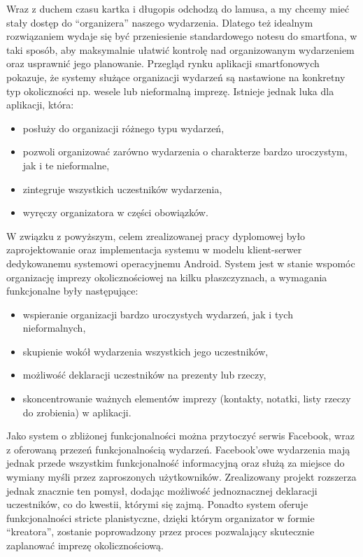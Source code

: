 \documentclass[12pt,titlepage]{article}
\begin{document}
Wraz z duchem czasu kartka i długopis odchodzą do lamusa, a my chcemy mieć stały dostęp do ``organizera'' naszego wydarzenia. Dlatego też idealnym rozwiązaniem
wydaje się być przeniesienie standardowego notesu do smartfona, w taki sposób, aby maksymalnie ułatwić kontrolę nad organizowanym wydarzeniem oraz usprawnić jego planowanie.
Przegląd rynku aplikacji smartfonowych pokazuje, że systemy służące organizacji wydarzeń są nastawione na konkretny typ okoliczności np. wesele lub nieformalną imprezę.
Istnieje jednak luka dla aplikacji, która:

\begin{itemize}
 \item posłuży do organizacji różnego typu wydarzeń,
 \item pozwoli organizować zarówno wydarzenia o charakterze bardzo uroczystym, jak i te nieformalne,
 \item zintegruje wszystkich uczestników wydarzenia,
 \item wyręczy organizatora w części obowiązków.
\end{itemize}


W związku z powyższym, celem zrealizowanej pracy dyplomowej było zaprojektowanie oraz implementacja systemu w modelu klient-serwer dedykowanemu systemowi operacyjnemu Android.
System jest w stanie wspomóc organizację imprezy okolicznościowej na kilku płaszczyznach, a wymagania funkcjonalne były następujące:

\begin{itemize}
 \item wspieranie organizacji bardzo uroczystych wydarzeń, jak i tych nieformalnych,
 \item skupienie wokół wydarzenia wszystkich jego uczestników,
 \item możliwość deklaracji uczestników na prezenty lub rzeczy,
 \item skoncentrowanie ważnych elementów imprezy (kontakty, notatki, listy rzeczy do zrobienia) w aplikacji.
\end{itemize}

Jako system o zbliżonej funkcjonalności można przytoczyć serwis Facebook, wraz z oferowaną przezeń funkcjonalnością wydarzeń.
Facebook'owe wydarzenia mają jednak przede wszystkim funkcjonalność informacyjną oraz służą za miejsce do wymiany myśli przez zaproszonych użytkowników.
Zrealizowany projekt rozszerza jednak znacznie ten pomysł, dodając możliwość jednoznacznej deklaracji uczestników, co do kwestii, którymi się zajmą.
Ponadto system oferuje funkcjonalności stricte planistyczne, dzięki którym organizator w formie ``kreatora'', zostanie poprowadzony przez proces pozwalający 
skutecznie zaplanować imprezę okolicznościową.
\end{document}
